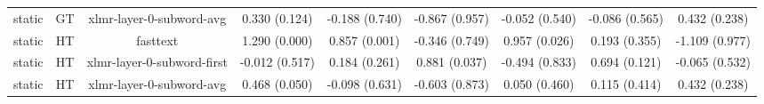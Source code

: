 \begin{sidewaystable}[htb]
\begin{tabular}{@{}ccccccccc@{}}
        static & GT & xlmr-layer-0-subword-avg & 0.330 (0.124) & -0.188 (0.740) & -0.867 (0.957) & -0.052 (0.540) & -0.086 (0.565) & 0.432 (0.238) \\
        static & HT & fasttext & 1.290 (0.000) & 0.857 (0.001) & -0.346 (0.749) & 0.957 (0.026) & 0.193 (0.355) & -1.109 (0.977) \\
        static & HT & xlmr-layer-0-subword-first & -0.012 (0.517) & 0.184 (0.261) & 0.881 (0.037) & -0.494 (0.833) & 0.694 (0.121) & -0.065 (0.532) \\
        static & HT & xlmr-layer-0-subword-avg & 0.468 (0.050) & -0.098 (0.631) & -0.603 (0.873) & 0.050 (0.460) & 0.115 (0.414) & 0.432 (0.238) \\
        \bottomrule
    \end{tabular}
\end{sidewaystable}